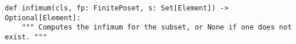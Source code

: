 \begin{verbatim}
def infimum(cls, fp: FinitePoset, s: Set[Element]) -> Optional[Element]:
    """ Computes the infimum for the subset, or None if one does not exist. """
\end{verbatim}